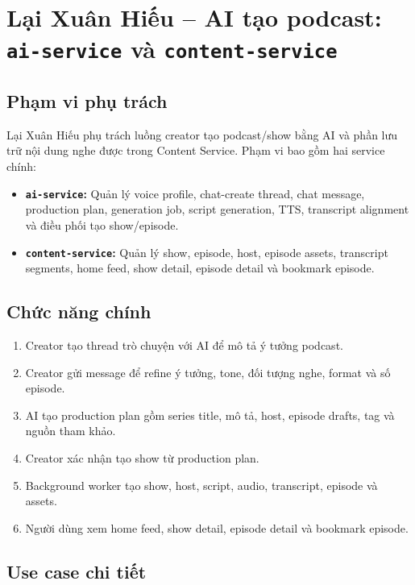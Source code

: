 \documentclass[14pt,a4paper,oneside]{extreport}
\begin{document}
\section{Lại Xuân Hiếu -- AI tạo podcast: \texttt{ai-service} và \texttt{content-service}}
\label{sec:phase3-ai-content}

\subsection{Phạm vi phụ trách}

Lại Xuân Hiếu phụ trách luồng creator tạo podcast/show bằng AI và phần lưu trữ nội dung nghe được trong Content Service. Phạm vi bao gồm hai service chính:

\begin{itemize}[leftmargin=2cm]
  \item \textbf{\texttt{ai-service}:} Quản lý voice profile, chat-create thread, chat message, production plan, generation job, script generation, TTS, transcript alignment và điều phối tạo show/episode.
  \item \textbf{\texttt{content-service}:} Quản lý show, episode, host, episode assets, transcript segments, home feed, show detail, episode detail và bookmark episode.
\end{itemize}

\subsection{Chức năng chính}

\begin{enumerate}[leftmargin=2cm]
  \item Creator tạo thread trò chuyện với AI để mô tả ý tưởng podcast.
  \item Creator gửi message để refine ý tưởng, tone, đối tượng nghe, format và số episode.
  \item AI tạo production plan gồm series title, mô tả, host, episode drafts, tag và nguồn tham khảo.
  \item Creator xác nhận tạo show từ production plan.
  \item Background worker tạo show, host, script, audio, transcript, episode và assets.
  \item Người dùng xem home feed, show detail, episode detail và bookmark episode.
\end{enumerate}

\subsection{Use case chi tiết}
\end{document}

